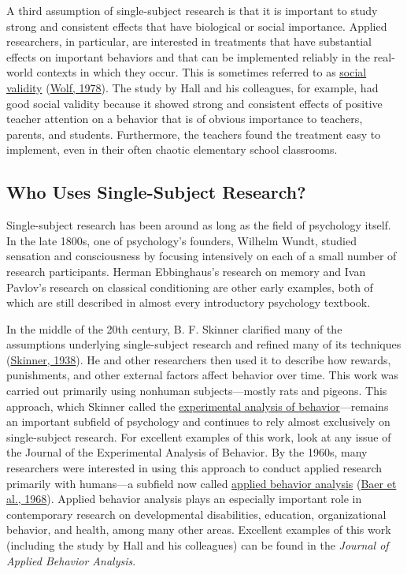 \documentclass[
]{krantz}
\begin{document}
A third assumption of single-subject research is that it is important to study strong and consistent effects that have biological or social importance. Applied researchers, in particular, are interested in treatments that have substantial effects on important behaviors and that can be implemented reliably in the real-world contexts in which they occur. This is sometimes referred to as \protect\hyperlink{social-validity}{social validity} (\protect\hyperlink{ref-wolf1978social}{Wolf, 1978}). The study by Hall and his colleagues, for example, had good social validity because it showed strong and consistent effects of positive teacher attention on a behavior that is of obvious importance to teachers, parents, and students. Furthermore, the teachers found the treatment easy to implement, even in their often chaotic elementary school classrooms.

\hypertarget{who-uses-single-subject-research}{%
\subsection*{Who Uses Single-Subject Research?}\label{who-uses-single-subject-research}}


Single-subject research has been around as long as the field of psychology itself. In the late 1800s, one of psychology's founders, Wilhelm Wundt, studied sensation and consciousness by focusing intensively on each of a small number of research participants. Herman Ebbinghaus's research on memory and Ivan Pavlov's research on classical conditioning are other early examples, both of which are still described in almost every introductory psychology textbook.

In the middle of the 20th century, B. F. Skinner clarified many of the assumptions underlying single-subject research and refined many of its techniques (\protect\hyperlink{ref-skinner1938behavior}{Skinner, 1938}). He and other researchers then used it to describe how rewards, punishments, and other external factors affect behavior over time. This work was carried out primarily using nonhuman subjects---mostly rats and pigeons. This approach, which Skinner called the \protect\hyperlink{experimental-analysis-of-behavior}{experimental analysis of behavior}---remains an important subfield of psychology and continues to rely almost exclusively on single-subject research. For excellent examples of this work, look at any issue of the Journal of the Experimental Analysis of Behavior. By the 1960s, many researchers were interested in using this approach to conduct applied research primarily with humans---a subfield now called \protect\hyperlink{applied-behavior-analysis}{applied behavior analysis} (\protect\hyperlink{ref-baer1968some}{Baer et al., 1968}). Applied behavior analysis plays an especially important role in contemporary research on developmental disabilities, education, organizational behavior, and health, among many other areas. Excellent examples of this work (including the study by Hall and his colleagues) can be found in the \emph{Journal of Applied Behavior Analysis}.
\end{document}
